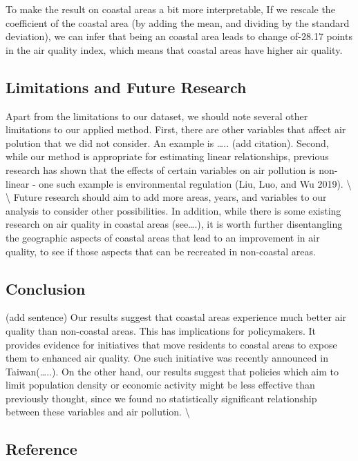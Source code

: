 \documentclass[
]{article}
\begin{document}
To make the result on coastal areas a bit more interpretable, If we
rescale the coefficient of the coastal area (by adding the mean, and
dividing by the standard deviation), we can infer that being an coastal
area leads to change of-28.17 points in the air quality index, which
means that coastal areas have higher air quality.

\hypertarget{limitations-and-future-research}{%
\subsection{Limitations and Future
Research}\label{limitations-and-future-research}}

Apart from the limitations to our dataset, we should note several other
limitations to our applied method. First, there are other variables that
affect air polution that we did not consider. An example is \ldots..
(add citation). Second, while our method is appropriate for estimating
linear relationships, previous research has shown that the effects of
certain variables on air pollution is non-linear - one such example is
environmental regulation (Liu, Luo, and Wu 2019). \textbackslash{}
\textbackslash{} Future research should aim to add more areas, years,
and variables to our analysis to consider other possibilities. In
addition, while there is some existing research on air quality in
coastal areas (see\ldots.), it is worth further disentangling the
geographic aspects of coastal areas that lead to an improvement in air
quality, to see if those aspects that can be recreated in non-coastal
areas.

\hypertarget{conclusion}{%
\subsection{Conclusion}\label{conclusion}}

(add sentence) Our results suggest that coastal areas experience much
better air quality than non-coastal areas. This has implications for
policymakers. It provides evidence for initiatives that move residents
to coastal areas to expose them to enhanced air quality. One such
initiative was recently announced in Taiwan(\ldots..). On the other
hand, our results suggest that policies which aim to limit population
density or economic activity might be less effective than previously
thought, since we found no statistically significant relationship
between these variables and air pollution. \textbackslash{}

\hypertarget{Reference}{%
\subsection{Reference}\label{Reference}}
\end{document}
